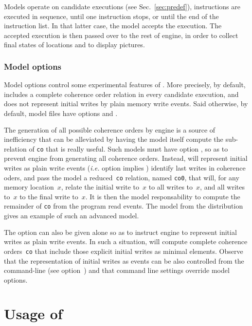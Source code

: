 Models operate on candidate executions
(see Sec.~\ref{sec:predef}),
instructions are executed in sequence,
until one instruction stops, or until the end of the instruction list.
In that latter case, the model accepts the execution.
The accepted execution is then passed over to the rest of \herd{}
engine, in order to collect final states of locations
and to display pictures.

\subsubsection*{Model options}

Model options control some experimental features of \herd.
More precisely, by default, \herd{} includes a complete
coherence order relation in every candidate execution,
and does not represent initial writes by plain memory
write events. Said otherwise, by default,
model files have options  and .

The generation of all possible coherence orders by \herd{} engine
is a source of inefficiency that can be alleviated by having the
model itself compute the sub-relation of \texttt{co} that is really useful.
Such models must have option , so as to
prevent \herd{} engine from generating all coherence orders.
Instead, \herd{} will represent initial writes as plain write events
(\emph{i.e.} option  implies )
identify last writes in coherence oders, and pass the model a
reduced~\texttt{co} relation, named \texttt{co0}, that will,
for any memory location~$x$,
relate the initial write to~$x$ to all writes to~$x$, and all writes
to~$x$ to the final write to~$x$.
It is then the model responsability  to compute the remainder
of \texttt{co} from the program read events.
The model  from the distribution
gives an example of such an advanced model.

The option  can also be given alone so as to instruct
\herd{} engine to represent initial writes as plain write events.
In such a situation, \herd{} will compute complete coherence
orders~\texttt{co} that include those explicit initial writes as
minimal elements.
Observe that the representation of initial writes as events
can be also controlled from the
command-line (see option~)
and that command line settings override model options.

\section{Usage of \herd}

